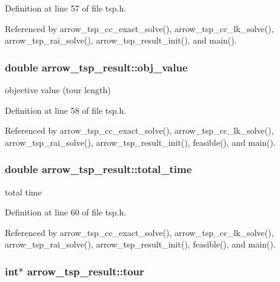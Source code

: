Definition at line 57 of file tsp.h.

Referenced by arrow\_\-tsp\_\-cc\_\-exact\_\-solve(), arrow\_\-tsp\_\-cc\_\-lk\_\-solve(), arrow\_\-tsp\_\-rai\_\-solve(), arrow\_\-tsp\_\-result\_\-init(), and main().\hypertarget{structarrow__tsp__result_f0fae9756e4c924517addf05988cfcb9}{
\subsubsection[{obj\_\-value}]{\setlength{\rightskip}{0pt plus 5cm}double {\bf arrow\_\-tsp\_\-result::obj\_\-value}}}
\label{structarrow__tsp__result_f0fae9756e4c924517addf05988cfcb9}


objective value (tour length) 

Definition at line 58 of file tsp.h.

Referenced by arrow\_\-tsp\_\-cc\_\-exact\_\-solve(), arrow\_\-tsp\_\-cc\_\-lk\_\-solve(), arrow\_\-tsp\_\-rai\_\-solve(), arrow\_\-tsp\_\-result\_\-init(), feasible(), and main().\hypertarget{structarrow__tsp__result_82ea7aa0320d932892602d34339a9276}{
\subsubsection[{total\_\-time}]{\setlength{\rightskip}{0pt plus 5cm}double {\bf arrow\_\-tsp\_\-result::total\_\-time}}}
\label{structarrow__tsp__result_82ea7aa0320d932892602d34339a9276}


total time 

Definition at line 60 of file tsp.h.

Referenced by arrow\_\-tsp\_\-cc\_\-exact\_\-solve(), arrow\_\-tsp\_\-cc\_\-lk\_\-solve(), arrow\_\-tsp\_\-rai\_\-solve(), arrow\_\-tsp\_\-result\_\-init(), feasible(), and main().\hypertarget{structarrow__tsp__result_48433b03146d6ca3423a555ea2139d52}{
\subsubsection[{tour}]{\setlength{\rightskip}{0pt plus 5cm}int$\ast$ {\bf arrow\_\-tsp\_\-result::tour}}}
\label{structarrow__tsp__result_48433b03146d6ca3423a555ea2139d52}


